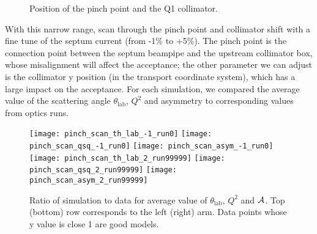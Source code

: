 \begin{figure}[H]
    \centering
    \caption{Position of the pinch point and the Q1 collimator.}
\end{figure}
With this narrow range, scan through the pinch point and collimator shift with a fine tune
of the septum current (from -1\% to +5\%). The pinch point is the connection point
between the septum beampipe and the upstream collimator box, whose misalignment will affect
the acceptance; the other parameter we can adjust is the collimator y position (in the transport
coordinate system),
which has a large impact on the acceptance. For each simulation, we
compared the average value of the scattering angle $\theta_{\text{lab}}$, $Q^2$ and asymmetry to
corresponding values from optics runs.

\begin{figure}[H]
    \centering
    \texttt{[image: pinch\_scan\_th\_lab\_-1\_run0]}
    \texttt{[image: pinch\_scan\_qsq\_-1\_run0]}
    \texttt{[image: pinch\_scan\_asym\_-1\_run0]}
    \texttt{[image: pinch\_scan\_th\_lab\_2\_run99999]}
    \texttt{[image: pinch\_scan\_qsq\_2\_run99999]}
    \texttt{[image: pinch\_scan\_asym\_2\_run99999]}
    \caption[Ratio plot of simulation to data]{Ratio of simulation to data for average value of
    $\theta_{\text{lab}}$, $Q^2$ and $\mathcal{A}$. Top (bottom) row corresponds to
    the left (right) arm. Data points whose y value is close 1 are good models.
    }
    \label{fig:pinch_scan}
\end{figure}

